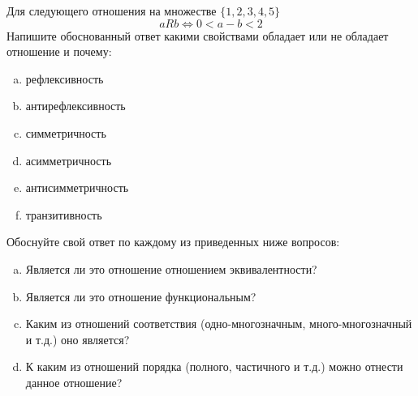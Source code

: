 \question
Для следующего отношения на множестве $\{1, 2, 3, 4, 5\}$ 
\begin{equation*}
aRb \iff 0 < a-b<2
\end{equation*}
Напишите обоснованный ответ какими свойствами обладает или не обладает отношение и почему:   
\begin{enumerate} [a)]\setcounter{enumi}{0}
\item рефлексивность
\item антирефлексивность
\item симметричность
\item асимметричность
\item антисимметричность
\item транзитивность
\end{enumerate}

Обоснуйте свой ответ по каждому из приведенных ниже вопросов:
\begin{enumerate} [a)]\setcounter{enumi}{0}
    \item Является ли это отношение отношением эквивалентности?
    \item Является ли это отношение функциональным?
    \item Каким из отношений соответствия (одно-многозначным, много-многозначный и т.д.) оно является?
    \item К каким из отношений порядка (полного, частичного и т.д.) можно отнести данное отношение?
\end{enumerate}
